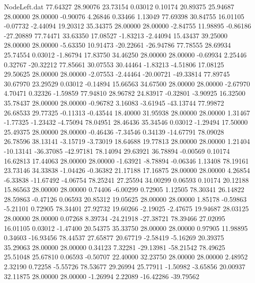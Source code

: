 \begin{filecontents}{NodeLeft.dat}
  77.64327   28.90076   23.73154     0.03012    0.10174   20.89375   25.94687   28.00000   28.00000   -0.90076    4.26846    0.33466    1.13049
  77.69398   30.84755   16.01105    -0.07732   -2.44094   19.20312   35.34375   28.00000   28.00000   -2.84755   11.98895   -0.86186  -27.20889
  77.74471   33.63350   17.08527    -1.83213   -2.44094   15.43437   39.25000   28.00000   28.00000   -5.63350   10.91473  -20.22661  -26.94786
  77.78555   28.69934   25.74554     0.03012   -1.86794   17.83750   34.46250   28.00000   28.00000   -0.69934    2.25446    0.32767  -20.32212
  77.85661   30.07553   30.44464    -1.83213   -4.51806   17.08125   29.50625   28.00000   28.00000   -2.07553   -2.44464  -20.00721  -49.33814
  77.89745   30.67970   23.29529     0.03012   -0.14894   15.66563   34.67500   28.00000   28.00000   -2.67970    4.70471    0.32326   -1.59859
  77.94810   28.96782   24.83917    -0.32801   -3.90925   16.32500   35.78437   28.00000   28.00000   -0.96782    3.16083   -3.61945  -43.13744
  77.99872   26.68533   29.77325    -0.11313   -0.43544   18.40000   31.95938   28.00000   28.00000    1.31467   -1.77325   -1.23432   -4.75094
  78.04951   28.46436   35.34546     0.03012   -1.29494   17.50000   25.49375   28.00000   28.00000   -0.46436   -7.34546    0.34139  -14.67791
  78.09028   26.78596   38.13141    -3.15719   -3.73019   18.64688   19.77813   28.00000   28.00000    1.21404  -10.13141  -36.37085  -42.97181
  78.14094   29.63921   36.78894    -0.00569    0.10174   16.62813   17.44063   28.00000   28.00000   -1.63921   -8.78894   -0.06346    1.13408
  78.19161   23.73146   34.33838    -1.04426   -0.36382   21.17188   17.16875   28.00000   28.00000    4.26854   -6.33838  -11.67492   -4.06754
  78.25241   27.25594   34.00299     0.06593    0.10174   20.12188   15.86563   28.00000   28.00000    0.74406   -6.00299    0.72905    1.12505
  78.30341   26.14822   28.59863    -0.47126    0.06593   20.85312   19.05625   28.00000   28.00000    1.85178   -0.59863   -5.21101    0.72905
  78.34401   27.92732   19.60266    -2.19025   -2.47675   19.94687   28.03125   28.00000   28.00000    0.07268    8.39734  -24.21918  -27.38721
  78.39466   27.02095   16.01105     0.03012   -1.47400   20.54375   35.33750   28.00000   28.00000    0.97905   11.98895    0.34603  -16.93456
  78.44537   27.65877   20.67719    -2.58419   -5.16269   20.39375   35.29063   28.00000   28.00000    0.34123    7.32281  -29.13981  -58.21542
  78.49625   25.51048   25.67810     0.06593   -0.50707   22.40000   32.23750   28.00000   28.00000    2.48952    2.32190    0.72258   -5.55726
  78.53677   29.26994   25.77911    -1.50982   -3.65856   20.00937   32.11875   28.00000   28.00000   -1.26994    2.22089  -16.42286  -39.79562

\end{filecontents}

